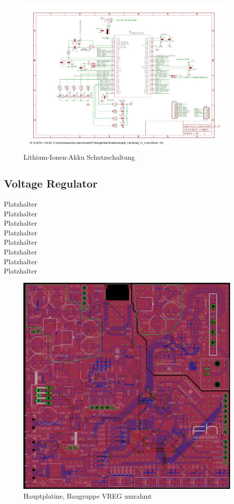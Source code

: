 \documentclass[a4paper]{scrartcl}
\begin{document}
\begin{figure}[H]\centering
\includegraphics[page=7, angle=90, width=\linewidth]{../eagle/Mainboard/watchplb_mainboard_v1_0.pdf}
\caption{Lithium-Ionen-Akku Schutzschaltung}
\label{fig:abb1}
\end{figure}

\subsection{Voltage Regulator}

Platzhalter\\Platzhalter\\Platzhalter\\Platzhalter\\Platzhalter\\Platzhalter\\
Platzhalter\\Platzhalter

\begin{figure}[H]\centering
\includegraphics[page=1, angle=0, width=\linewidth]{../Documentation/pics/mainboard_vreg.png}
\caption{Hauptplatine, Baugruppe VREG umrahmt}
\label{fig:abb1}
\end{figure}
\end{document}
